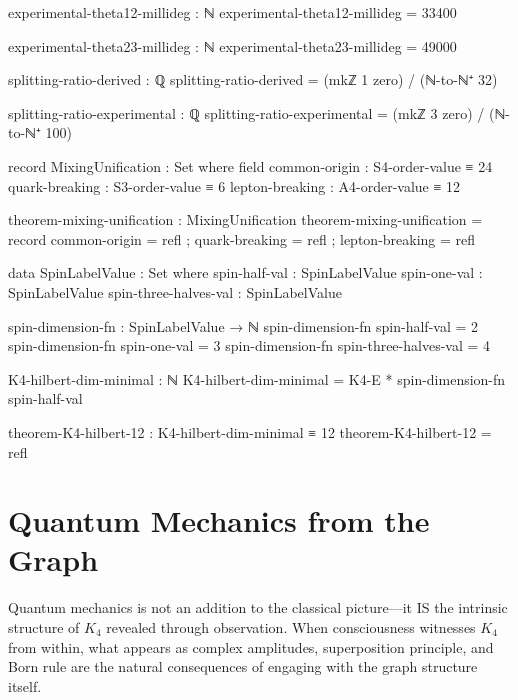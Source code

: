 \documentclass[11pt,a4paper]{book}
\begin{document}
\begin{code}
experimental-theta12-millideg : ℕ
experimental-theta12-millideg = 33400

experimental-theta23-millideg : ℕ
experimental-theta23-millideg = 49000
\end{code}

\begin{code}
splitting-ratio-derived : ℚ
splitting-ratio-derived = (mkℤ 1 zero) / (ℕ-to-ℕ⁺ 32)
\end{code}

\begin{code}
splitting-ratio-experimental : ℚ
splitting-ratio-experimental = (mkℤ 3 zero) / (ℕ-to-ℕ⁺ 100)
\end{code}

\begin{code}
record MixingUnification : Set where
  field
    common-origin    : S4-order-value ≡ 24
    quark-breaking   : S3-order-value ≡ 6
    lepton-breaking  : A4-order-value ≡ 12

theorem-mixing-unification : MixingUnification
theorem-mixing-unification = record
  { common-origin   = refl
  ; quark-breaking  = refl
  ; lepton-breaking = refl
  }
\end{code}

\begin{code}
data SpinLabelValue : Set where
  spin-half-val : SpinLabelValue
  spin-one-val : SpinLabelValue
  spin-three-halves-val : SpinLabelValue

spin-dimension-fn : SpinLabelValue → ℕ
spin-dimension-fn spin-half-val = 2
spin-dimension-fn spin-one-val = 3
spin-dimension-fn spin-three-halves-val = 4

K4-hilbert-dim-minimal : ℕ
K4-hilbert-dim-minimal = K4-E * spin-dimension-fn spin-half-val

theorem-K4-hilbert-12 : K4-hilbert-dim-minimal ≡ 12
theorem-K4-hilbert-12 = refl
\end{code}


\chapter{Quantum Mechanics from the Graph}
\label{chap:quantum-mechanics}

Quantum mechanics is not an addition to the classical picture—it IS the intrinsic structure of $K_4$ revealed through observation. When consciousness witnesses $K_4$ from within, what appears as complex amplitudes, superposition principle, and Born rule are the natural consequences of engaging with the graph structure itself.
\end{document}

